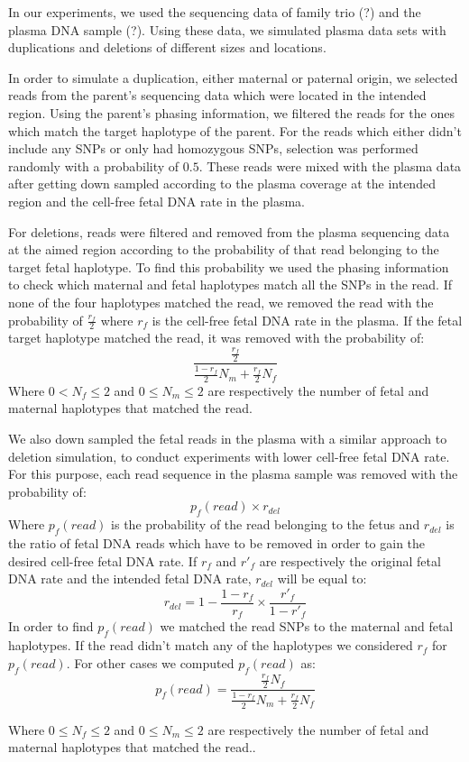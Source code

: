 \documentclass[10pt,a4paper]{article}
\begin{document}
	In our experiments, we used the sequencing data of family trio (?) and the plasma DNA sample (?). Using these data, we simulated plasma data sets with duplications and deletions of different sizes and locations.

	In order to simulate a duplication, either maternal or paternal origin, we selected reads from the parent's sequencing data which were located in the intended region. Using the parent's phasing information, we filtered the reads for the ones which match the target haplotype of the parent. For the reads which either didn't include any SNPs or only had homozygous SNPs, selection was performed randomly with a probability of $0.5$. These reads were mixed with the plasma data after getting down sampled according to the plasma coverage at the intended region and the cell-free fetal DNA rate in the plasma.
	
	For deletions, reads were filtered and removed from the plasma sequencing data at the aimed region according to the probability of that read belonging to the target fetal haplotype. To find this probability we used the phasing information to check which maternal and fetal haplotypes match all the SNPs in the read. If none of the four haplotypes matched the read, we removed the read with the probability of $\frac{r_f}{2}$ where $r_f$ is the cell-free fetal DNA rate in the plasma. If the fetal target haplotype matched the read, it was removed with the probability of:
	$$\frac{ \frac{r_f}{2} } { \frac{1-r_f}{2} N_m + \frac{r_f}{2} N_f}$$
	Where $0 < N_f \leq 2$ and $0 \leq N_m \leq 2$ are respectively the number of fetal and maternal haplotypes that matched the read.
	
	We also down sampled the fetal reads in the plasma with a similar approach to deletion simulation, to conduct experiments with lower cell-free fetal DNA rate. For this purpose, each read sequence in the plasma sample was removed with the probability of:
	 $$p_f(read) \times r_{del}$$
	 Where $p_f(read)$ is the probability of the read belonging to the fetus and $r_{del}$ is the ratio of fetal DNA reads which have to be removed in order to gain the desired cell-free fetal DNA rate. If $r_f$ and $r'_f$ are respectively the original fetal DNA rate and the intended fetal DNA rate, $r_{del}$ will be equal to:
	 $$r_{del}= 1 - \frac{1 - r_f } { r_f} \times \frac{r'_f}{1-r'_f}$$
	 In order to find $p_f(read)$ we matched the read SNPs to the maternal and fetal haplotypes. If the read didn't match any of the haplotypes we considered $r_f$ for $p_f(read)$. For other cases we computed $p_f(read)$ as:
	 $$p_f(read)= \frac{ \frac{r_f}{2}N_f } { \frac{1-r_f}{2} N_m + \frac{r_f}{2} N_f}$$
	 	 
	Where $0 \leq N_f \leq 2$ and $0 \leq N_m \leq 2$ are respectively the number of fetal and maternal haplotypes that matched the read..
 
\end{document}
